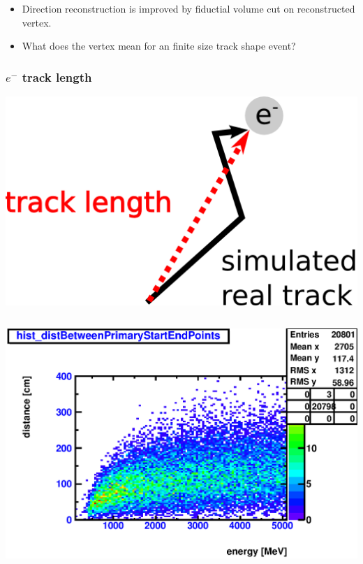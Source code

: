 \documentclass{beamer}
\begin{document}
\begin{frame}
	\begin{itemize}
		\item Direction reconstruction is improved by fiductial volume cut on
			reconstructed vertex.
		\item What does the vertex mean for an finite size track shape event?
	\end{itemize}
\end{frame}

\begin{frame}
	\frametitle{$e^{-}$ track length}
	\begin{center}
		\includegraphics[height=0.2\textheight]{track_length_definition.png}
	\end{center}
	\begin{columns}[t]
		\includegraphics[width=1.0\textwidth]{nue_H1_distBetweenPrimaryStartEndPoints_onlyCC_maxR600cm.eps}

\end{columns}
\end{frame}
\end{document}
